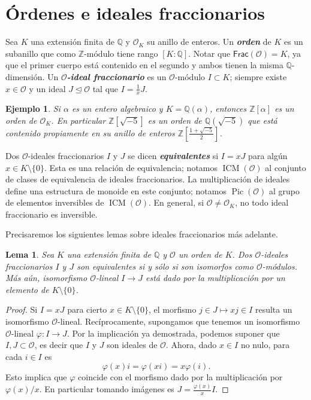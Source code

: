 \documentclass[11pt,a4paper]{amsart}
\newcommand{\Q}{\mathbb{Q}}
\newcommand{\Z}{\mathbb{Z}}
\renewcommand{\emph}[1]{\textbf{\textit{#1}}}
\DeclareMathOperator{\Pic}{Pic}
\DeclareMathOperator{\ICM}{ICM}
\numberwithin{equation}{section}
\theoremstyle{plain}
\newtheorem{ej}[equation]{Ejemplo}
\newtheorem{lem}[equation]{Lema}
\renewcommand{\O}{\mathcal{O}}
\begin{document}
\section{Órdenes e ideales fraccionarios}\label{sec:ord}

Sea $K$ una extensión finita de $\Q$ y $\O_K$ su anillo de enteros. Un
\emph{orden} de $K$ es un subanillo que como $\Z$-módulo tiene
rango $[K:\Q]$. Notar que $\mathsf{Frac}(\mathcal O) = K$, ya que el primer
cuerpo está contenido en el segundo y ambos tienen la misma
$\Q$-dimensión. Un \emph{$\mathcal O$-ideal fraccionario} es
un $\mathcal O$-módulo $I \subset K$; siempre existe $x \in \mathcal O$
y un ideal $J \trianglelefteq \mathcal O$ tal que $I = \frac{1}{x} J$.
\begin{ej} Si $\alpha$ es un entero algebraico y $K=\Q(\alpha)$,
entonces $\Z[\alpha]$ es un orden de $\O_K$. En particular
$\Z[\sqrt{-5}]$ es un orden de $\Q(\sqrt{-5})$ que está contenido
propiamente en su anillo de enteros $\Z[\frac{1+\sqrt{-5}}{2}]$.
\end{ej}
Dos $\mathcal O$-ideales fraccionarios $I$ y $J$ se dicen \emph{equivalentes}
si $I = xJ$ para algún $x \in K \setminus \{0\}$. Esta es una relación
de equivalencia; notamos $\ICM(\mathcal O)$ al conjunto de clases de
equivalencia de ideales fraccionarios. La multiplicación de ideales define
una estructura de monoide en este conjunto; notamos $\Pic(\O)$
al grupo de elementos inversibles de $\ICM(\O)$. En general,
si $\mathcal O \ne \mathcal O_K$, no todo
ideal fraccionario es inversible.

Precisaremos los siguientes lemas sobre ideales fraccionarios
más adelante.

\begin{lem} \label{lem:hom=units}
Sea $K$ una extensión finita de $\Q$ y
$\mathcal O$ un orden de $K$.
Dos $\O$-ideales fraccionarios $I$
y $J$ son equivalentes si y sólo si son isomorfos como $\O$-módulos.
Más aún, isomorfismo $\O$-lineal $I \to J$ está dado por la multiplicación
por un elemento de $K\setminus \{0\}$.
\end{lem}
\begin{proof} Si $I = xJ$ para cierto $x \in K \setminus \{0\}$,
el morfismo $j \in J \mapsto xj \in I$ resulta un isomorfismo $\O$-lineal.
Recíprocamente, supongamos que tenemos un isomorfismo $\O$-lineal
$\varphi \colon I \to J$. Por la implicación ya demostrada, podemos suponer
que $I, J \subset \O$, es decir que $I$ y $J$ son ideales de $\O$.
Ahora, dado $x \in I$ no nulo, para cada $i \in I$ es
\[
\varphi(x)i = \varphi(xi) = x\varphi(i).
\]
Esto implica que $\varphi$ coincide con el morfismo dado por la multiplicación
por $\varphi(x)/x$. En particular tomando imágenes es
$J = \frac{\varphi(x)}{x} I$.
\end{proof}
\end{document}
